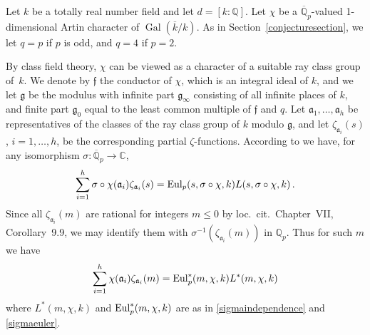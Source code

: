 \documentclass{amsart}
\begin{document}
Let $k$ be a totally real number field and let $d=[k:{\mathbb Q}]$. Let $\chi$ be a
${{\overline {\mathbb Q}_p}}$-valued 1-dimensional Artin character of ${\operatorname{Gal}}({\overline{k}}/k)$. As
in Section~\ref{conjecturesection}, we let $q = p$ if $p$ is odd, and
$q = 4$ if $p = 2$. 

By class field theory, $\chi$ can be viewed as a character of a
suitable ray class group of~$k$.  We denote by $\mathfrak{f}$ the
conductor of $\chi$, which is an integral ideal of $k$, and we let
$\mathfrak{g}$ be the modulus with infinite part $\mathfrak{g}_\infty$
consisting of all infinite places of $k$, and finite part
$\mathfrak{g}_0$ equal to the least common multiple of $\mathfrak{f}$
and $q$.  Let $\mathfrak{a}_1, \dots, \mathfrak{a}_h$ be
representatives of the classes of the ray class group of $k$ modulo
$\mathfrak{g}$, and let $\zeta_{\mathfrak{a}_i}(s)$, $i = 1, \dots,h$,
be the corresponding partial $ {\zeta} $-functions.  According to
\cite[Chapter~VII, p.526]{Neu99} we have, for any isomorphism
$\sigma:{{\overline {\mathbb Q}_p}} \to {\mathbb C}$,
\begin{equation*}
\sum_{i=1}^h {\sigma}\circ\chi(\mathfrak{a}_i) \zeta_{\mathfrak{a}_i}(s) 
=
{\textup{Eul}}_p(s,{\sigma}\circ\chi,k) {L(s,{{\sigma}\circ\chi},k)}
\,.
\end{equation*}
Since all $ \zeta_{\mathfrak{a}_i}(m) $  are rational for integers $ m \leq 0 $
by loc.\ cit.\ Chapter~VII, Corollary~9.9, we may identify them with
$ \sigma^{-1}(\zeta_{\mathfrak{a}_i}(m)) $  in $ {{\mathbb Q_p}} $.
Thus for such $ m $ we have
\begin{equation}\label{partialzeta}
\sum_{i=1}^h  \chi(\mathfrak{a}_i) \zeta_{\mathfrak{a}_i}(m) 
= 
{\textup{Eul}}^\ast_p(m, \chi, k) L^\ast(m, \chi, k) 
\end{equation}
where $L^\ast(m, \chi, k)$ and ${\textup{Eul}}^\ast_p(m, \chi, k)$ are as
in \eqref{sigmaindependence} and \eqref{sigmaeuler}.
\end{document}
